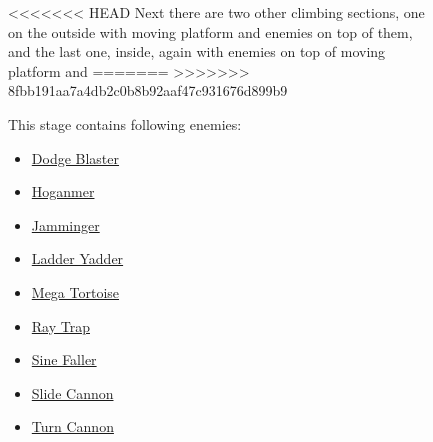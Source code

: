 \begin{figure}[htp]
<<<<<<< HEAD
Next there are two other climbing sections, one on the outside with moving platform and enemies on top of them, and the last one, inside, again with enemies on top of moving platform and 
=======
>>>>>>> 8fbb191aa7a4db2c0b8b92aaf47c931676d899b9

This stage contains following enemies\cite{wiki:Tower}:

\begin{itemize}
	\item \hyperlink{enem:Dodge_Blaster}{Dodge Blaster}
	\item \hyperlink{enem:Hoganmer}{Hoganmer}
	\item \hyperlink{enem:Jamminger}{Jamminger}
	\item \hyperlink{enem:Ladder_Yadder}{Ladder Yadder}
	\item \hyperlink{enem:Mega_Tortoise}{Mega Tortoise}
	\item \hyperlink {enem:Ray_Trap}{Ray Trap}
	\item \hyperlink{enem:Sine_Faller}{Sine Faller}
	\item \hyperlink{enem:Slide_Cannon}{Slide Cannon}
	\item \hyperlink{enem:Turn_Cannon}{Turn Cannon}
\end{itemize}


\end{figure}
